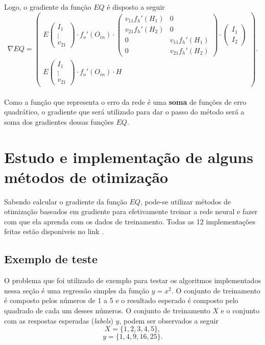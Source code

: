 \documentclass[a4paper,12pt]{article}
\begin{document}
Logo, o gradiente da função $EQ$ é disposto a seguir
$$
\nabla EQ = 
\begin{pmatrix}  E\begin{pmatrix}I_{1}\\ \vdots \\v_{21} \end{pmatrix}\cdot f_o'(O_{in})\cdot
\begin{pmatrix}
v_{11} f_h'(H_1) & 0 \\ 
v_{21}f_h'(H_2) & 0 \\
0 & v_{11} f_h'(H_1)\\
0 & v_{21}f_h'(H_2)
\end{pmatrix} \cdot
\begin{pmatrix}
I_1 \\ I_2
\end{pmatrix}
\\
E\begin{pmatrix}I_{1}\\ \vdots \\v_{21} \end{pmatrix}\cdot f_o'(O_{in})\cdot H
\end{pmatrix}.
$$\\

Como a função que representa o erro da rede é uma \textbf{soma} de funções de erro quadrático, o gradiente que será utilizado para dar o passo do método será a soma dos gradientes dessas funções $EQ$. 

\section{Estudo e implementação de alguns métodos de otimização}
Sabendo calcular o gradiente da função $EQ$, pode-se utilizar métodos de otimização baseados em gradiente para efetivamente treinar a rede neural e fazer com que ela aprenda com os dados de treinamento. Todas as 12 implementações feitas estão disponiveis no link \cite{linkReplit}.


\subsection*{Exemplo de teste}
O problema que foi utilizado de exemplo para testar os algoritmos implementados nessa seção é uma regressão simples da função $y = x^2$. O conjunto de treinamento é composto pelos números de 1 a 5 e o resultado esperado é composto pelo quadrado de cada um desses números. O conjunto de treinamento $X$ e o conjunto com as respostas esperadas (\textit{labels}) $y$, podem ser observados a seguir
$$X = \{1,2,3,4,5 \},$$
$$y = \{1,4,9,16,25 \}.$$
\end{document}
